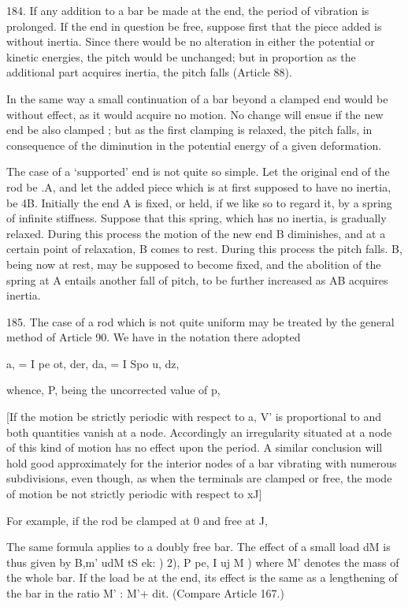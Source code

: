 184. If any addition to a bar be made at the end, the period of
vibration is prolonged. If the end in question be free, suppose first
that the piece added is without inertia. Since there would be no
alteration in either the potential or kinetic energies, the pitch would
be unchanged; but in proportion as the additional part acquires inertia,
the pitch falls (Article 88).

In the same way a small continuation of a bar beyond a clamped end would
be without effect, as it would acquire no motion. No change will ensue
if the new end be also clamped ; but as the first clamping is relaxed,
the pitch falls, in consequence of the diminution in the potential
energy of a given deformation.

The case of a `supported' end is not quite so simple. Let the original
end of the rod be .A, and let the added piece which is at first supposed
to have no inertia, be 4B. Initially the end A is fixed, or held, if we
like so to regard it, by a spring of infinite stiffness. Suppose that
this spring, which has no inertia, is gradually relaxed. During this
process the motion of the new end B diminishes, and at a certain point
of relaxation, B comes to rest. During this process the pitch falls. B,
being now at rest, may be supposed to become fixed, and the abolition of
the spring at A entails another fall of pitch, to be further increased
as AB acquires inertia.

185. The case of a rod which is not quite uniform may be
treated by the general method of Article 90. We have in the notation
there adopted

a, = I pe ot, der, da, = I Spo u, dz,

whence, P, being the uncorrected value of p,

[If the motion be strictly periodic with respect to a, V' is
proportional to and both quantities vanish at a node.
Accordingly an irregularity situated at a node of this kind of motion
has no effect upon the period. A similar conclusion will hold good
approximately for the interior nodes of a bar vibrating with
numerous subdivisions, even though, as when the terminals are
clamped or free, the mode of motion be not strictly periodic with
respect to xJ]

For example, if the rod be clamped at 0 and free at J,

The same formula applies to a doubly free bar. The effect of a small
load dM is thus given by B,m' udM tS ek: ) 2), P pe, I uj M ) where M'
denotes the mass of the whole bar. If the load be at
the end, its effect is the same as a lengthening of the bar in the ratio
M' : M'+ dit. (Compare Article 167.)

